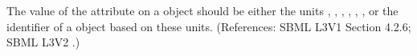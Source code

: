 The value of the attribute  on a \Model object should be
either the units , , ,
, , , or the identifier of a
\UnitDefinition object based on these units.  (References: SBML L3V1 Section 4.2.6; SBML L3V2
.)
